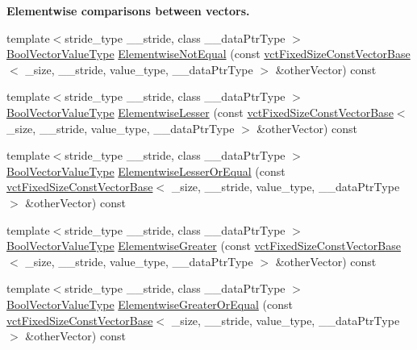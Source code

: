 \begin{Indent}{\bf Elementwise comparisons between vectors.}
\begin{DoxyCompactItemize}
\item 
{\footnotesize template$<$stride\-\_\-type \-\_\-\-\_\-stride, class \-\_\-\-\_\-data\-Ptr\-Type $>$ }\\\hyperlink{classvct_fixed_size_const_vector_base_a15899465a75a2f78965bdcf2d6e34bc5}{Bool\-Vector\-Value\-Type} \hyperlink{classvct_fixed_size_const_vector_base_affd4520d21b356049664b7b696c73e51}{Elementwise\-Not\-Equal} (const \hyperlink{classvct_fixed_size_const_vector_base}{vct\-Fixed\-Size\-Const\-Vector\-Base}$<$ \-\_\-size, \-\_\-\-\_\-stride, value\-\_\-type, \-\_\-\-\_\-data\-Ptr\-Type $>$ \&other\-Vector) const 
\item 
{\footnotesize template$<$stride\-\_\-type \-\_\-\-\_\-stride, class \-\_\-\-\_\-data\-Ptr\-Type $>$ }\\\hyperlink{classvct_fixed_size_const_vector_base_a15899465a75a2f78965bdcf2d6e34bc5}{Bool\-Vector\-Value\-Type} \hyperlink{classvct_fixed_size_const_vector_base_a6858554efb3024dcac960994b3762eed}{Elementwise\-Lesser} (const \hyperlink{classvct_fixed_size_const_vector_base}{vct\-Fixed\-Size\-Const\-Vector\-Base}$<$ \-\_\-size, \-\_\-\-\_\-stride, value\-\_\-type, \-\_\-\-\_\-data\-Ptr\-Type $>$ \&other\-Vector) const 
\item 
{\footnotesize template$<$stride\-\_\-type \-\_\-\-\_\-stride, class \-\_\-\-\_\-data\-Ptr\-Type $>$ }\\\hyperlink{classvct_fixed_size_const_vector_base_a15899465a75a2f78965bdcf2d6e34bc5}{Bool\-Vector\-Value\-Type} \hyperlink{classvct_fixed_size_const_vector_base_a09107ff818ef0b09a8012db430a1be32}{Elementwise\-Lesser\-Or\-Equal} (const \hyperlink{classvct_fixed_size_const_vector_base}{vct\-Fixed\-Size\-Const\-Vector\-Base}$<$ \-\_\-size, \-\_\-\-\_\-stride, value\-\_\-type, \-\_\-\-\_\-data\-Ptr\-Type $>$ \&other\-Vector) const 
\item 
{\footnotesize template$<$stride\-\_\-type \-\_\-\-\_\-stride, class \-\_\-\-\_\-data\-Ptr\-Type $>$ }\\\hyperlink{classvct_fixed_size_const_vector_base_a15899465a75a2f78965bdcf2d6e34bc5}{Bool\-Vector\-Value\-Type} \hyperlink{classvct_fixed_size_const_vector_base_aecfe9c83072108ad25e703d123308bda}{Elementwise\-Greater} (const \hyperlink{classvct_fixed_size_const_vector_base}{vct\-Fixed\-Size\-Const\-Vector\-Base}$<$ \-\_\-size, \-\_\-\-\_\-stride, value\-\_\-type, \-\_\-\-\_\-data\-Ptr\-Type $>$ \&other\-Vector) const 
\item 
{\footnotesize template$<$stride\-\_\-type \-\_\-\-\_\-stride, class \-\_\-\-\_\-data\-Ptr\-Type $>$ }\\\hyperlink{classvct_fixed_size_const_vector_base_a15899465a75a2f78965bdcf2d6e34bc5}{Bool\-Vector\-Value\-Type} \hyperlink{classvct_fixed_size_const_vector_base_a5c06998807817166a95ecb4c39672a45}{Elementwise\-Greater\-Or\-Equal} (const \hyperlink{classvct_fixed_size_const_vector_base}{vct\-Fixed\-Size\-Const\-Vector\-Base}$<$ \-\_\-size, \-\_\-\-\_\-stride, value\-\_\-type, \-\_\-\-\_\-data\-Ptr\-Type $>$ \&other\-Vector) const 
\end{DoxyCompactItemize}
\end{Indent}
